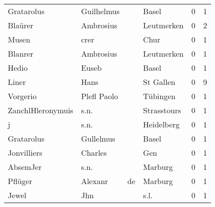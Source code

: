 \begin{tabular}{llllrr}
               Gratarolus &                         Guilhelmus &             &                                       Basel &          0 &         1 \\
                  Blaürer &                          Ambrosius &             &                                  Leutmerken &          0 &         2 \\
                    Musen &                               crer &             &                                        Chur &          0 &         1 \\
                  Blanrer &                          Ambrosius &             &                                  Leutmerken &          0 &         1 \\
                    Hedio &                              Euseb &             &                                       Basel &          0 &         1 \\
                    Liner &                               Hans &             &                                   St Gallen &          0 &         9 \\
                 Vorgerio &                        Plefl Paolo &             &                                    Tübingen &          0 &         1 \\
        ZanchlHleronymuis &                               s.n. &             &                                 Strasstours &          0 &         1 \\
                        j &                               s.n. &             &                                  Heidelberg &          0 &         1 \\
               Gratarolus &                          Gullelmus &             &                                       Basel &          0 &         1 \\
              Jonvilliers &                            Charles &             &                                         Gen &          0 &         1 \\
                 AbsemJer &                               s.n. &             &                                     Marburg &          0 &         1 \\
                  Pflüger &                            Alexanr &          de &                                     Marburg &          0 &         1 \\
                    Jewel &                                Jhn &             &                                        s.l. &          0 &         1 \\

\end{tabular}
